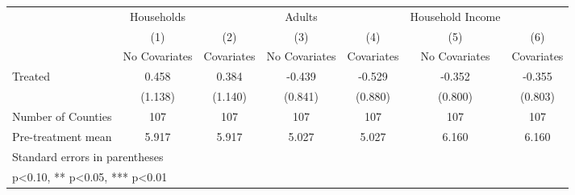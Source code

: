 {
\def\sym#1{\ifmmode^{#1}\else\(^{#1}\)\fi}
\begin{tabular}{l*{6}{c}}
\hline\hline
            &  Households   &               &      Adults   &               &Household Income   &               \\
            &\multicolumn{1}{c}{(1)}&\multicolumn{1}{c}{(2)}&\multicolumn{1}{c}{(3)}&\multicolumn{1}{c}{(4)}&\multicolumn{1}{c}{(5)}&\multicolumn{1}{c}{(6)}\\
            &\multicolumn{1}{c}{No Covariates}&\multicolumn{1}{c}{Covariates}&\multicolumn{1}{c}{No Covariates}&\multicolumn{1}{c}{Covariates}&\multicolumn{1}{c}{No Covariates}&\multicolumn{1}{c}{Covariates}\\
\hline
Treated     &       0.458   &       0.384   &      -0.439   &      -0.529   &      -0.352   &      -0.355   \\
            &     (1.138)   &     (1.140)   &     (0.841)   &     (0.880)   &     (0.800)   &     (0.803)   \\
\hline
Number of Counties&         107   &         107   &         107   &         107   &         107   &         107   \\
Pre-treatment mean&       5.917   &       5.917   &       5.027   &       5.027   &       6.160   &       6.160   \\
\hline\hline
\multicolumn{7}{l}{\footnotesize Standard errors in parentheses}\\
\multicolumn{7}{l}{\footnotesize * p<0.10, ** p<0.05, *** p<0.01}\\
\end{tabular}
}
